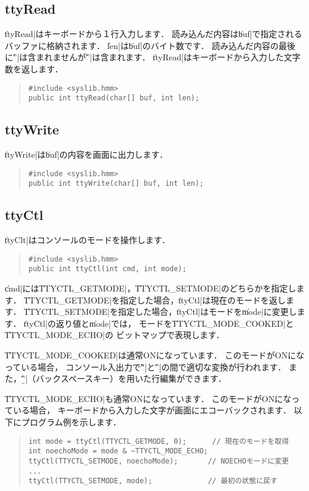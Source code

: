 \subsection{ttyRead}

\|ttyRead|はキーボードから１行入力します．
読み込んだ内容は\|buf|で指定されるバッファに格納されます．
\|len|は\|buf|のバイト数です．
読み込んだ内容の最後に\|'\0'|は含まれませんが\|'\n'|は含まれます．
\|ttyRead|はキーボードから入力した文字数を返します．

\begin{quote}
\begin{verbatim}
#include <syslib.hmm>
public int ttyRead(char[] buf, int len);
\end{verbatim}
\end{quote}

\subsection{ttyWrite}

\|ttyWrite|は\|buf|の内容を画面に出力します．

\begin{quote}
\begin{verbatim}
#include <syslib.hmm>
public int ttyWrite(char[] buf, int len);
\end{verbatim}
\end{quote}

\subsection{ttyCtl}

\|ttyClt|はコンソールのモードを操作します．

\begin{quote}
\begin{verbatim}
#include <syslib.hmm>
public int ttyCtl(int cmd, int mode);
\end{verbatim}
\end{quote}

\|cmd|には\|TTYCTL_GETMODE|，\|TTYCTL_SETMODE|のどちらかを指定します．
\|TTYCTL_GETMODE|を指定した場合，\|ttyCtl|は現在のモードを返します．
\|TTYCTL_SETMODE|を指定した場合，\|ttyCtl|はモードを\|mode|に変更します．
\|ttyCtl|の返り値と\|mode|では，
モードを\|TTYCTL_MODE_COOKED|と\|TTYCTL_MODE_ECHO|の
ビットマップで表現します．

\|TTYCTL_MODE_COOKED|は通常ONになっています．
このモードがONになっている場合，
コンソール入出力で\|'\r'|と\|'\n'|の間で適切な変換が行われます．
また，\|'\b'|（バックスペースキー）を用いた行編集ができます．

\|TTYCTL_MODE_ECHO|も通常ONになっています．
このモードがONになっている場合，
キーボードから入力した文字が画面にエコーバックされます．
以下にプログラム例を示します．

\begin{quote}
\begin{verbatim}
int mode = ttyCtl(TTYCTL_GETMODE, 0);      // 現在のモードを取得
int noechoMode = mode & ~TTYCTL_MODE_ECHO;
ttyCtl(TTYCTL_SETMODE, noechoMode);       // NOECHOモードに変更
...
ttyCtl(TTYCTL_SETMODE, mode);             // 最初の状態に戻す
\end{verbatim}
\end{quote}
